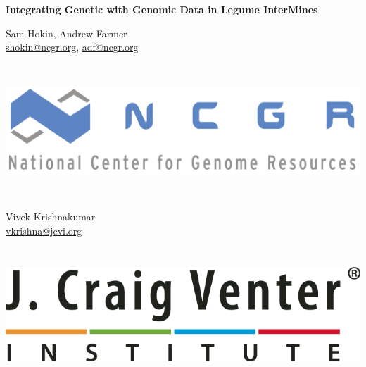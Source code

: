 \documentclass[]{pagposter}
\begin{document}


\veryHuge\color{NCGRBlue} 
\textbf{Integrating Genetic with Genomic Data in Legume InterMines}
\vspace{5mm} \\
\normalsize\color{Black}

\begin{minipage}[c]{0.25\linewidth}
  \LARGE Sam Hokin, Andrew Farmer \\
  \normalsize \url{shokin@ncgr.org}, \url{adf@ncgr.org}
\end{minipage}
\begin{minipage}[c]{0.32\linewidth}
  \includegraphics[height=50mm]{NCGR_logo.pdf}     %
\end{minipage}
\begin{minipage}[c]{0.18\linewidth}
  \LARGE
  Vivek Krishnakumar \\
  \normalsize
  \url{vkrishna@jcvi.org}
\end{minipage}
\begin{minipage}[c]{0.24\linewidth}
  \includegraphics[height=50mm]{VenterInstituteLogoR.png}       %
\end{minipage}
\end{document}
